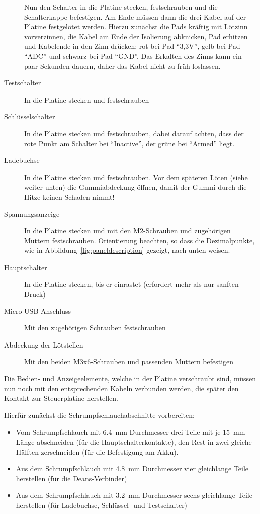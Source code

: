 \documentclass[paper=a4, open=any, numbers=noenddot]{scrbook}
\begin{document}
\begin{description}
					      Nun den Schalter in die Platine stecken, festschrauben und die Schalterkappe befestigen. Am Ende müssen dann die drei Kabel auf der Platine festgelötet werden. Hierzu zunächst die Pads kräftig mit Lötzinn vorverzinnen, die Kabel am Ende der Isolierung abknicken, Pad erhitzen und Kabelende in den Zinn drücken: rot bei Pad \enquote{3,3V}, gelb bei Pad \enquote{ADC} und schwarz bei Pad \enquote{GND}. Das Erkalten des Zinns kann ein paar Sekunden dauern, daher das Kabel nicht zu früh loslassen.
					\item [Testschalter] In die Platine stecken und festschrauben
					\item [Schlüsselschalter] In die Platine stecken und festschrauben, dabei darauf achten, dass der rote Punkt am Schalter bei \enquote{Inactive}, der grüne bei \enquote{Armed} liegt.
					\item [Ladebuchse] In die Platine stecken und festschrauben. Vor dem späteren Löten (siehe weiter unten) die Gummiabdeckung öffnen, damit der Gummi durch die Hitze keinen Schaden nimmt!
					\item [Spannungsanzeige] In die Platine stecken und mit den M2-Schrauben und zugehörigen Muttern festschrauben. Orientierung beachten, so dass die Dezimalpunkte, wie in Abbildung~\ref{fig:paneldescription} gezeigt, nach unten weisen.
					\item [Hauptschalter] In die Platine stecken, bis er einrastet (erfordert mehr als nur sanften Druck)
					\item [Micro-USB-Anschluss] Mit den zugehörigen Schrauben festschrauben
					\item [Abdeckung der Lötstellen] Mit den beiden M3x6-Schrauben und passenden Muttern befestigen
				\end{description}

				Die Bedien- und Anzeigeelemente, welche in der Platine verschraubt sind, müssen nun noch mit den entsprechenden Kabeln verbunden werden, die später den Kontakt zur Steuerplatine herstellen.

				Hierfür zunächst die Schrumpfschlauchabschnitte vorbereiten:
				\begin{itemize}
					\item Vom Schrumpfschlauch mit \SI{6,4}{\milli\metre} Durchmesser drei Teile mit je \SI{15}{\milli\metre} Länge abschneiden (für die Hauptschalterkontakte), den Rest in zwei gleiche Hälften zerschneiden (für die Befestigung am Akku).
					\item Aus dem Schrumpfschlauch mit \SI{4,8}{\milli\metre} Durchmesser vier gleichlange Teile herstellen (für die Deans-Verbinder)
					\item Aus dem Schrumpfschlauch mit \SI{3,2}{\milli\metre} Durchmesser sechs gleichlange Teile herstellen (für Ladebuchse, Schlüssel- und Testschalter)
				\end{itemize}
\end{document}
